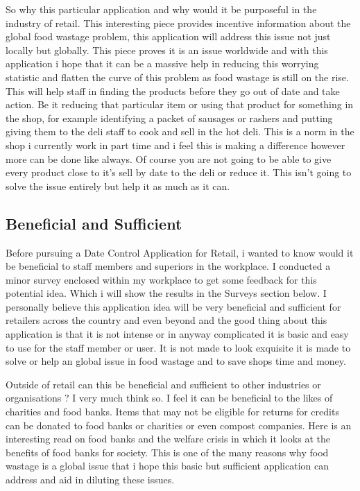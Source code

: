 So why this particular application and why would it be purposeful in the industry of retail. This interesting piece \cite{gustavsson2011global} provides incentive information about the global food wastage problem, this application will address this issue not just locally but globally. This piece proves it is an issue worldwide and with this application i hope that it can be a massive help in reducing this worrying statistic and flatten the curve of this problem as food wastage is still on the rise. This will help staff in finding the products before they go out of date and take action. Be it reducing that particular item or using that product for something in the shop, for example identifying a packet of sausages or rashers and putting giving them to the deli staff to cook and sell in the hot deli. This is a norm in the shop i currently work in part time and i feel this is making a difference however more can be done like always. Of course you are not going to be able to give every product close to it's sell by date to the deli or reduce it. This isn't going to solve the issue entirely but help it as much as it can. 

\subsection{Beneficial and Sufficient}
Before pursuing a Date Control Application for Retail, i wanted to know would it be beneficial to staff members and superiors in the workplace. I conducted a minor survey enclosed within my workplace to get some feedback for this potential idea. Which i will show the results in the Surveys section below. I personally believe this application idea will be very beneficial and sufficient for retailers across the country and even beyond and the good thing about this application is that it is not intense or in anyway complicated it is basic and easy to use for the staff member or user. It is not made to look exquisite it is made to solve or help an global issue in food wastage and to save shops time and money.
\newline

Outside of retail can this be beneficial and sufficient to other industries or organisations ? I very much think so. I feel it can be beneficial to the likes of charities and food banks. Items that may not be eligible for returns for credits can be donated to food banks or charities or even compost companies. \cite{riches1986food} Here is an interesting read on food banks and the welfare crisis in which it looks at the benefits of food banks for society. This is one of the many reasons why food wastage is a global issue that i hope this basic but sufficient application can address and aid in diluting these issues. 
\newline

